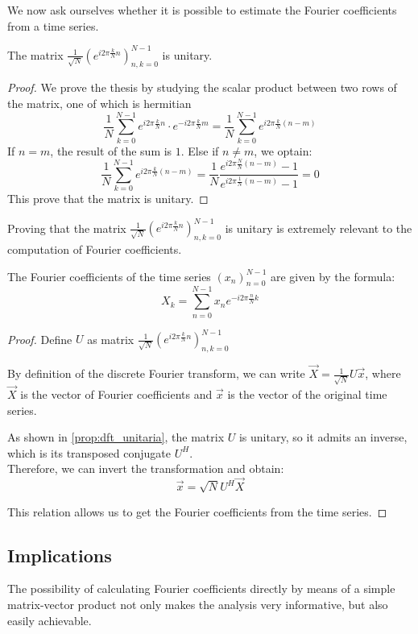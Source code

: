 \bigskip
We now ask ourselves whether it is possible to estimate the Fourier coefficients from a time series.
\begin{proposition} \label{prop:dft_unitaria}
	The matrix $\frac{1}{\sqrt{N}}\left(e^{i2\pi\frac{k}{N}n}\right)_{n,k=0}^{N-1}$ is unitary.
	\begin{proof}
		We prove the thesis by studying the scalar product between two rows of the matrix, one of which is hermitian
		\[
		\frac{1}{N}\sum_{k=0}^{N-1} e^{i2\pi\frac{k}{N}n}\cdot e^{-i2\pi\frac{k}{N}m} = \frac{1}{N}\sum_{k=0}^{N-1} e^{i2\pi\frac{k}{N}(n-m)}
		\]
		If $n = m$, the result of the sum is $1$. Else if $n \neq m$, we optain:
		\[
			\frac{1}{N}\sum_{k=0}^{N-1} e^{i2\pi\frac{k}{N}(n-m)} = \frac{1}{N}\frac{e^{i2\pi\frac{N}{N}(n-m)}-1}{e^{i2\pi\frac{1}{N}(n-m)}-1} = 0
		\]
		This prove that the matrix is unitary.
	\end{proof}
\end{proposition}

\bigskip
Proving that the matrix $\frac{1}{\sqrt{N}}(e^{i2\pi\frac{k}{N}n})_{n,k=0}^{N-1}$ is unitary is extremely relevant to the computation of Fourier coefficients.
\begin{theorem}
	The Fourier coefficients of the time series $(x_n)_{n=0}^{N-1}$ are given by the formula:
	\begin{equation}
		X_k = \sum_{n=0}^{N-1} x_n e^{-i2\pi\frac{n}{N}k}
	\end{equation}
	\begin{proof}
		Define $U$ as matrix $\frac{1}{\sqrt{N}}(e^{i2\pi\frac{k}{N}n})_{n,k=0}^{N-1}$

		\noindent By definition of the discrete Fourier transform, we can write $\vec{X} = \frac{1}{\sqrt{N}}U\vec{x}$, where $\vec{X}$ is the vector of Fourier coefficients and $\vec{x}$ is the vector of the original time series.

		\noindent As shown in \cref{prop:dft_unitaria}, the matrix $U$ is unitary, so it admits an inverse, which is its transposed conjugate $U^H$. \\
		Therefore, we can invert the transformation and obtain:
		\[
			\vec{x} = \sqrt{N}U^H\vec{X}
		\]

		\noindent This relation allows us to get the Fourier coefficients from the time series.
	\end{proof}
\end{theorem}

\subsection{Implications}
The possibility of calculating Fourier coefficients directly by means of a simple matrix-vector product not only makes the analysis very informative, but also easily achievable.

